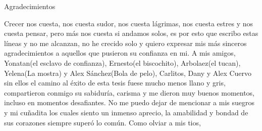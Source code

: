 \begin{acknowledgements}
    Agradecimientos
\end{acknowledgements}


Crecer nos cuesta, nos cuesta sudor, nos cuesta lágrimas, nos cuesta estres y nos cuesta pensar, pero más nos cuesta si andamos solos, es por esto que escribo 
estas líneas y no me alcanzan, no he crecido solo y quiero expresar mis más sinceros agradecimientos a aquellos que pusieron su confianza en mi. A mis amigos, 
Yonatan(el esclavo de confianza), Ernesto(el biscochito), Arbolaez(el tucan), Yelena(La mostra) y Alex Sánchez(Bola de pelo), Carlitos, Dany y Alex Cuervo sin 
ellos el camino al éxito de esta tesis fuese mucho menos llano y gris, compartieron conmigo su sabiduría, carisma y me dieron muy buenos momentos, incluso en 
momentos desafiantes. No me puedo dejar de mencionar a mis suegros y mi cuñadita los cuales siento un inmenso aprecio, la amabilidad y bondad de sus corazones 
siempre superó lo común. Como olviar a mis tios,
